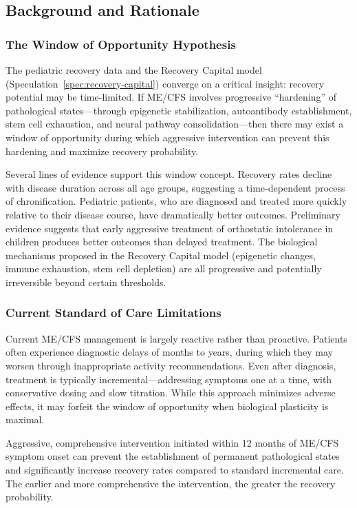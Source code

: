 \subsection{Background and Rationale}

\subsubsection{The Window of Opportunity Hypothesis}

The pediatric recovery data and the Recovery Capital model (Speculation~\ref{spec:recovery-capital}) converge on a critical insight: recovery potential may be time-limited. If ME/CFS involves progressive ``hardening'' of pathological states---through epigenetic stabilization, autoantibody establishment, stem cell exhaustion, and neural pathway consolidation---then there may exist a window of opportunity during which aggressive intervention can prevent this hardening and maximize recovery probability.

Several lines of evidence support this window concept. Recovery rates decline with disease duration across all age groups, suggesting a time-dependent process of chronification. Pediatric patients, who are diagnosed and treated more quickly relative to their disease course, have dramatically better outcomes. Preliminary evidence suggests that early aggressive treatment of orthostatic intolerance in children produces better outcomes than delayed treatment. The biological mechanisms proposed in the Recovery Capital model (epigenetic changes, immune exhaustion, stem cell depletion) are all progressive and potentially irreversible beyond certain thresholds.

\subsubsection{Current Standard of Care Limitations}

Current ME/CFS management is largely reactive rather than proactive. Patients often experience diagnostic delays of months to years, during which they may worsen through inappropriate activity recommendations. Even after diagnosis, treatment is typically incremental---addressing symptoms one at a time, with conservative dosing and slow titration. While this approach minimizes adverse effects, it may forfeit the window of opportunity when biological plasticity is maximal.

\begin{hypothesis}
\label{hyp:front-loading}
Aggressive, comprehensive intervention initiated within 12 months of ME/CFS symptom onset can prevent the establishment of permanent pathological states and significantly increase recovery rates compared to standard incremental care. The earlier and more comprehensive the intervention, the greater the recovery probability.
\end{hypothesis}

